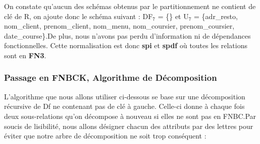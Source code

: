 \documentclass[french]{article}
\begin{document}
            \noindent
            On constate qu'aucun des schémas obtenus par le partitionnement ne contient de clé de R, on ajoute donc le schéma suivant :\newline
            DF$_{7}$ = \{\} et U$_{7}$ = \{adr\_resto, nom\_client, prenom\_client, nom\_menu, nom\_coursier, \newline prenom\_coursier, date\_course\}.\newline De plus, nous n'avons pas perdu d'information ni de dépendances fonctionnelles. Cette normalisation est donc \textbf{spi} et \textbf{spdf} où toutes les relations sont en \textbf{FN3}.
            
        \subsubsection *{Passage en FNBCK, Algorithme de Décomposition}
            L'algorithme que nous allons utiliser ci-dessous se base sur une décomposition récursive de Df ne contenant pas de clé à gauche. Celle-ci donne à chaque fois deux sous-relations qu'on décompose à nouveau si elles ne sont pas en FNBC.\newline Par soucis de lisibilité, nous allons désigner chacun des attributs par des lettres pour éviter que notre arbre de décomposition ne soit trop conséquent :
            \bigskip
            
\end{document}
